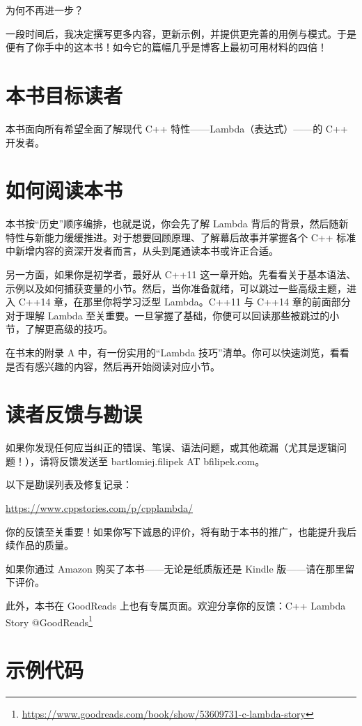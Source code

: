 为何不再进一步？

一段时间后，我决定撰写更多内容，更新示例，并提供更完善的用例与模式。于是便有了你手中的这本书！如今它的篇幅几乎是博客上最初可用材料的四倍！

\section{本书目标读者}

本书面向所有希望全面了解现代 C++ 特性——Lambda（表达式）——的 C++ 开发者。

\section{如何阅读本书}

本书按“历史”顺序编排，也就是说，你会先了解 Lambda 背后的背景，然后随新特性与新能力缓缓推进。对于想要回顾原理、了解幕后故事并掌握各个 C++ 标准中新增内容的资深开发者而言，从头到尾通读本书或许正合适。

另一方面，如果你是初学者，最好从 C++11 这一章开始。先看看关于基本语法、示例以及如何捕获变量的小节。然后，当你准备就绪，可以跳过一些高级主题，进入 C++14 章，在那里你将学习泛型 Lambda。C++11 与 C++14 章的前面部分对于理解 Lambda 至关重要。一旦掌握了基础，你便可以回读那些被跳过的小节，了解更高级的技巧。

在书末的附录 A 中，有一份实用的“Lambda 技巧”清单。你可以快速浏览，看看是否有感兴趣的内容，然后再开始阅读对应小节。

\section{读者反馈与勘误}

如果你发现任何应当纠正的错误、笔误、语法问题，或其他疏漏（尤其是逻辑问题！），请将反馈发送至 bartlomiej.filipek AT bfilipek.com。

以下是勘误列表及修复记录：

\url{https://www.cppstories.com/p/cpplambda/}

你的反馈至关重要！如果你写下诚恳的评价，将有助于本书的推广，也能提升我后续作品的质量。

如果你通过 Amazon 购买了本书——无论是纸质版还是 Kindle 版——请在那里留下评价。

此外，本书在 GoodReads 上也有专属页面。欢迎分享你的反馈：C++ Lambda Story @GoodReads\footnote{\url{https://www.goodreads.com/book/show/53609731-c-lambda-story}}

\section{示例代码}


